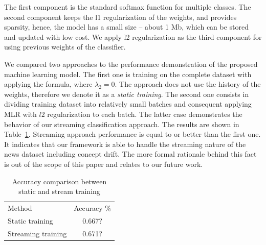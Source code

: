 The first component is the standard softmax function for multiple classes. The second component keeps the l1 regularization of the weights, and provides sparsity, hence, the model has a small size -- about 1 Mb, which can be stored and updated with low cost. We apply l2 regularization as the third component for using previous weights of the classifier.

We compared two approaches to the performance demonstration of the proposed machine learning model. The first one is training on the complete dataset with applying the formula, where $\lambda_2 = 0$. The approach does not use the history of the weights, therefore we denote it as a {\em static training}. The second one consists in dividing training dataset into relatively small batches and consequent applying MLR with $l2$ regularization to each batch. The latter case demonstrates the behavior of our streaming classification approach. The results are shown in Table~\ref{accuracy}. Streaming approach performance is equal to or better than the first one. It indicates that our framework is able to handle the streaming nature of the news dataset including concept drift. The more formal rationale behind this fact is out of the scope of this paper and relates to our future work.

\begin{table}[htbp]
\begin{tabular}{lc}
Method             & Accuracy \% \\
Static training    & 0.667?       \\
Streaming training & 0.671?         
\end{tabular}
\caption{Accuracy comparison between static and stream training}
\label{accuracy}
\vspace{-7mm}
\end{table}